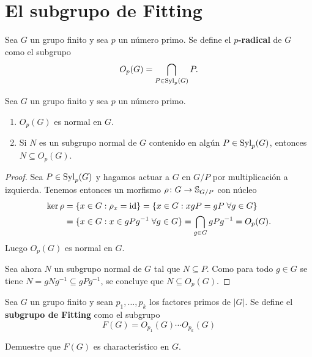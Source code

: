 \chapter{El subgrupo de Fitting}

\begin{definition}
	Sea $G$ un grupo finito y sea $p$ un número primo. Se define el
	\textbf{$p$-radical} de $G$ como el subgrupo
	\[
		O_p(G)=\bigcap_{P\in\mathrm{Syl}_p(G)}P.
	\]
\end{definition}

\begin{lemma}
	\label{lemma:core:Op(G)}
	Sea $G$ un grupo finito y sea $p$ un número primo. 
	\begin{enumerate}
		\item $O_p(G)$ es normal en $G$.
		\item Si $N$ es un subgrupo normal de $G$ contenido en algún
			$P\in\mathrm{Syl}_p(G)$, entonces $N\subseteq O_p(G)$.
	\end{enumerate}
\end{lemma}

\begin{proof}
	Sea $P\in\mathrm{Syl}_p(G)$ y hagamos actuar a $G$ en $G/P$ por multiplicación a
	izquierda. Tenemos entonces un morfismo $\rho\colon G\to\mathbb{S}_{G/P}$ con
	núcleo
	\begin{align*}
		\ker\rho&=\{x\in G:\rho_x=\operatorname{id}\}
		=\{x\in G:xgP=gP\;\forall g\in G\}\\
		&=\{x\in G:x\in gPg^{-1}\;\forall g\in G\}=\bigcap_{g\in G}gPg^{-1}=O_p(G).
	\end{align*}
	Luego $O_p(G)$ es normal en $G$.

	Sea ahora $N$ un subgrupo normal de $G$ tal que $N\subseteq P$. Como para
	todo $g\in G$ se tiene $N=gNg^{-1}\subseteq gPg^{-1}$, se concluye que
	$N\subseteq O_p(G)$.
\end{proof}

\begin{definition}
	Sea $G$ un grupo finito y sean $p_1,\dots,p_k$ los factores primos de
	$|G|$.  Se define el \textbf{subgrupo de Fitting} como el subgrupo
	\[
		F(G)=O_{p_1}(G)\cdots O_{p_k}(G)
	\]
\end{definition}

\begin{exercise}
	Demuestre que $F(G)$ es characterístico en $G$.
\end{exercise}



